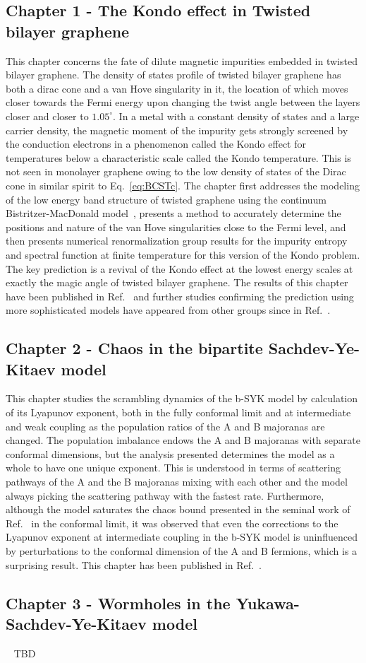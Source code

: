 \subsection{Chapter 1 - The Kondo effect in Twisted bilayer graphene}
This chapter concerns the fate of dilute magnetic impurities embedded in twisted bilayer graphene. The density of states profile of twisted bilayer graphene has both a dirac cone and a van Hove singularity in it, the location of which moves closer towards the Fermi energy upon changing the twist angle between the layers closer and closer to $1.05^\circ$. In a metal with a constant density of states and a large carrier density, the magnetic moment of the impurity gets strongly screened by the conduction electrons in a phenomenon called the Kondo effect for temperatures below a characteristic scale called the Kondo temperature. This is not seen in monolayer graphene owing to the low density of states of the Dirac cone in similar spirit to Eq.~\ref{eq:BCSTc}. The chapter first addresses the modeling of the low energy band structure of twisted graphene using the continuum Bistritzer-MacDonald model~\cite{Bistritzer2011}, presents a method to accurately determine the positions and nature of the van Hove singularities close to the Fermi level, and then presents numerical renormalization group results for the impurity entropy and spectral function at finite temperature for this version of the Kondo problem. The key prediction is a revival of the Kondo effect at the lowest energy scales at exactly the magic angle of twisted bilayer graphene. The results of this chapter have been published in Ref.~\cite{shankar2023kondo} and further studies confirming the prediction using more sophisticated models have appeared from other groups since in Ref.~\cite{chang2023vacancy}. 

\subsection{Chapter 2 - Chaos in the bipartite Sachdev-Ye-Kitaev model}
This chapter studies the scrambling dynamics of the b-SYK model by calculation of its Lyapunov exponent, both in the fully conformal limit and at intermediate and weak coupling as the population ratios of the A and B majoranas are changed. The population imbalance endows the A and B majoranas with separate conformal dimensions, but the analysis presented determines the model as a whole to have one unique exponent. This is understood in terms of scattering pathways of the A and the B majoranas mixing with each other and the model always picking the scattering pathway with the fastest rate. Furthermore, although the model saturates the chaos bound presented in the seminal work of Ref.~\cite{maldacena_bound_2016} in the conformal limit, it was observed that even the corrections to the Lyapunov exponent at intermediate coupling in the b-SYK model is uninfluenced by perturbations to the conformal dimension of the A and B fermions, which is a surprising result. This chapter has been published in Ref.~\cite{shankar2023lyapunov}.


\subsection{Chapter 3 - Wormholes in the Yukawa-Sachdev-Ye-Kitaev model}
~\cite{maldacena2003eternal}
TBD